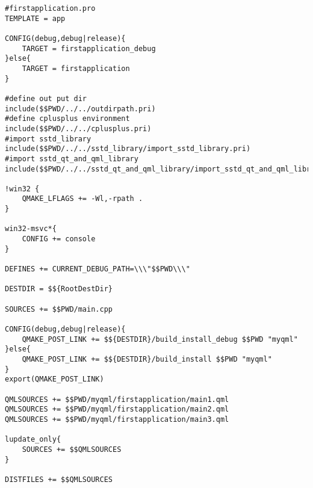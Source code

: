 \begin{lstlisting}[label=f000019,
caption=GoodLuck,
title=\lstlistingname\ \thelstlisting
]
#firstapplication.pro
TEMPLATE = app

CONFIG(debug,debug|release){
    TARGET = firstapplication_debug
}else{
    TARGET = firstapplication
}

#define out put dir
include($$PWD/../../outdirpath.pri)
#define cplusplus environment
include($$PWD/../../cplusplus.pri)
#import sstd_library
include($$PWD/../../sstd_library/import_sstd_library.pri)
#import sstd_qt_and_qml_library
include($$PWD/../../sstd_qt_and_qml_library/import_sstd_qt_and_qml_library.pri)

!win32 {
    QMAKE_LFLAGS += -Wl,-rpath .
}

win32-msvc*{
    CONFIG += console
}

DEFINES += CURRENT_DEBUG_PATH=\\\"$$PWD\\\"

DESTDIR = $${RootDestDir}

SOURCES += $$PWD/main.cpp

CONFIG(debug,debug|release){
    QMAKE_POST_LINK += $${DESTDIR}/build_install_debug $$PWD "myqml"
}else{
    QMAKE_POST_LINK += $${DESTDIR}/build_install $$PWD "myqml"
}
export(QMAKE_POST_LINK)

QMLSOURCES += $$PWD/myqml/firstapplication/main1.qml
QMLSOURCES += $$PWD/myqml/firstapplication/main2.qml
QMLSOURCES += $$PWD/myqml/firstapplication/main3.qml

lupdate_only{
    SOURCES += $$QMLSOURCES
}

DISTFILES += $$QMLSOURCES
\end{lstlisting}          %




































